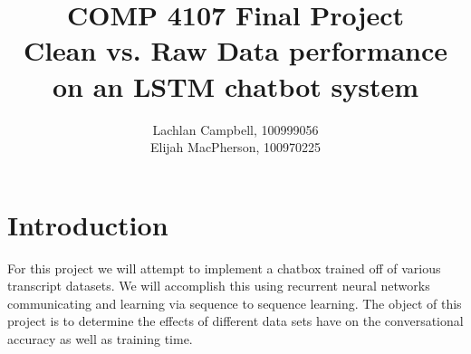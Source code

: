 \documentclass[titlepage]{article}
\newcommand\tab[1][1cm]{\hspace*{#1}}
\begin{document}
\title{COMP 4107 Final Project\\
         {\small Clean vs. Raw Data performance on an LSTM chatbot system}}
\author{Lachlan Campbell, 100999056\\
              Elijah MacPherson, 100970225}
\maketitle

\section{Introduction}
\tab For this project we will attempt to implement a chatbox trained off of various transcript datasets. We will accomplish this using recurrent neural networks communicating and learning via sequence to sequence learning. The object of this project is to determine the effects of different data sets have on the conversational accuracy as well as training time. 
\end{document}
